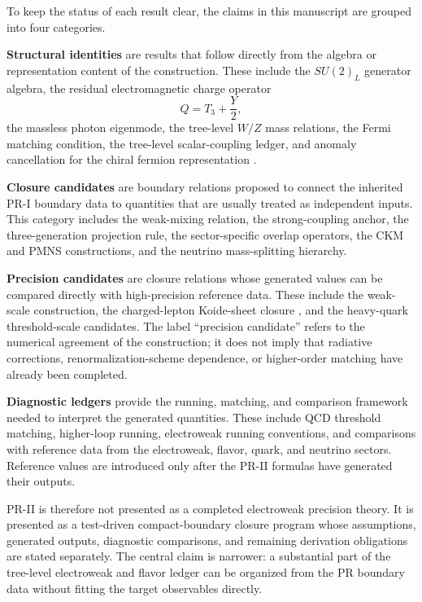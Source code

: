 \documentclass[11pt]{article}
\begin{document}
To keep the status of each result clear, the claims in this manuscript are grouped into four categories.

\textbf{Structural identities} are results that follow directly from the algebra or representation content of the construction. These include the \(SU(2)_L\) generator algebra, the residual electromagnetic charge operator
\begin{equation}
Q=T_3+\frac{Y}{2},
\end{equation}
the massless photon eigenmode, the tree-level \(W/Z\) mass relations, the Fermi matching condition, the tree-level scalar-coupling ledger, and anomaly cancellation for the chiral fermion representation \cite{Adler1969,Witten1982}.

\textbf{Closure candidates} are boundary relations proposed to connect the inherited PR-I boundary data to quantities that are usually treated as independent inputs. This category includes the weak-mixing relation, the strong-coupling anchor, the three-generation projection rule, the sector-specific overlap operators, the CKM and PMNS constructions, and the neutrino mass-splitting hierarchy.

\textbf{Precision candidates} are closure relations whose generated values can be compared directly with high-precision reference data. These include the weak-scale construction, the charged-lepton Koide-sheet closure \cite{Koide1983}, and the heavy-quark threshold-scale candidates. The label ``precision candidate'' refers to the numerical agreement of the construction; it does not imply that radiative corrections, renormalization-scheme dependence, or higher-order matching have already been completed.

\textbf{Diagnostic ledgers} provide the running, matching, and comparison framework needed to interpret the generated quantities. These include QCD threshold matching, higher-loop running, electroweak running conventions, and comparisons with reference data from the electroweak, flavor, quark, and neutrino sectors. Reference values are introduced only after the PR-II formulas have generated their outputs.

PR-II is therefore not presented as a completed electroweak precision theory. It is presented as a test-driven compact-boundary closure program whose assumptions, generated outputs, diagnostic comparisons, and remaining derivation obligations are stated separately. The central claim is narrower: a substantial part of the tree-level electroweak and flavor ledger can be organized from the PR boundary data without fitting the target observables directly.
\end{document}
